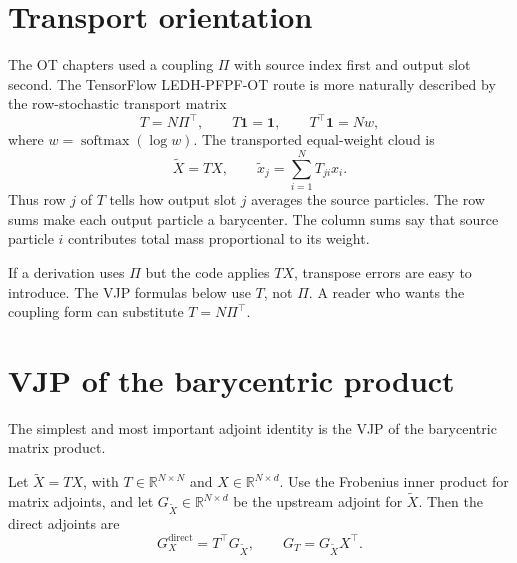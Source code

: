 \section{Transport orientation}
\label{sec:bf-ledh-ot-orientation}

The OT chapters used a coupling \(\Pi\) with source index first and output slot
second.  The TensorFlow LEDH-PFPF-OT route is more naturally described by the
row-stochastic transport matrix
\begin{equation}
\label{eq:bf-ledh-ot-row-transport}
  T = N\Pi^\top,
  \qquad
  T\mathbf 1=\mathbf 1,
  \qquad
  T^\top\mathbf 1=Nw,
\end{equation}
where \(w=\operatorname{softmax}(\log w)\).  The transported equal-weight cloud
is
\begin{equation}
\label{eq:bf-ledh-ot-barycentric-output}
  \widetilde X = T X,
  \qquad
  \widetilde x_j=\sum_{i=1}^N T_{ji}x_i .
\end{equation}
Thus row \(j\) of \(T\) tells how output slot \(j\) averages the source
particles.  The row sums make each output particle a barycenter.  The column
sums say that source particle \(i\) contributes total mass proportional to its
weight.

\begin{remark}
\label{rem:bf-ledh-ot-orientation}
If a derivation uses \(\Pi\) but the code applies \(T X\), transpose errors are
easy to introduce.  The VJP formulas below use \(T\), not \(\Pi\).  A reader who
wants the coupling form can substitute \(T=N\Pi^\top\).
\end{remark}

\section{VJP of the barycentric product}
\label{sec:bf-ledh-ot-barycentric-vjp}

The simplest and most important adjoint identity is the VJP of the barycentric
matrix product.

\begin{proposition}
\label{prop:bf-ledh-ot-barycentric-vjp}
Let \(\widetilde X=T X\), with \(T\in\mathbb R^{N\times N}\) and
\(X\in\mathbb R^{N\times d}\).  Use the Frobenius inner product for matrix
adjoints, and let \(G_{\widetilde X}\in\mathbb R^{N\times d}\) be the upstream
adjoint for \(\widetilde X\).  Then the direct adjoints are
\begin{equation}
\label{eq:bf-ledh-ot-vjp-barycentric}
  G_X^{\mathrm{direct}} = T^\top G_{\widetilde X},
  \qquad
  G_T = G_{\widetilde X}X^\top .
\end{equation}
\end{proposition}

